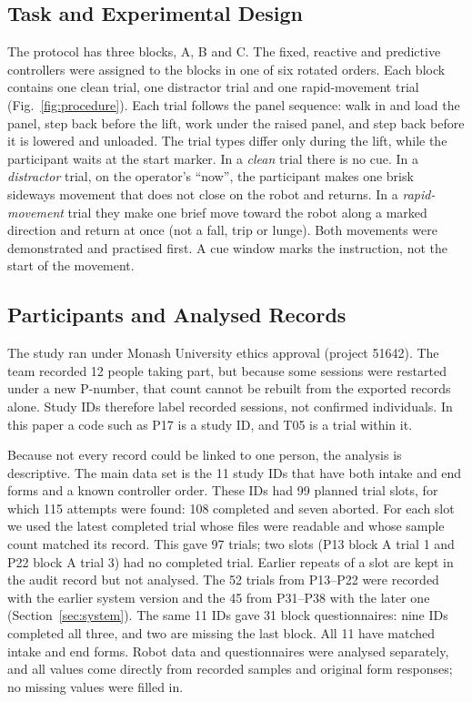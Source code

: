 \documentclass{IEEEtran}
\begin{document}
\subsection{Task and Experimental Design}
The protocol has three blocks, A, B and C. The fixed, reactive and predictive
controllers were assigned to the blocks in one of six rotated orders. Each
block contains one clean trial, one distractor trial and one rapid-movement
trial (Fig.~\ref{fig:procedure}). Each trial follows the panel sequence: walk
in and load the panel, step back before the lift, work under the raised panel,
and step back before it is lowered and unloaded. The trial types differ only
during the lift, while the participant waits at the start marker. In a
\emph{clean} trial there is no cue. In a \emph{distractor} trial, on the
operator's ``now'', the participant makes one brisk sideways movement that does
not close on the robot and returns. In a \emph{rapid-movement} trial they make
one brief move toward the robot along a marked direction and return at once
(not a fall, trip or lunge). Both movements were demonstrated and practised
first. A cue window marks the instruction, not the start of the movement.

\subsection{Participants and Analysed Records}
\label{sec:participants}
The study ran under Monash University ethics approval (project 51642). The team
recorded 12 people taking part, but because some sessions were restarted under
a new P-number, that count cannot be rebuilt from the exported records alone.
Study IDs therefore label recorded sessions, not confirmed individuals. In this
paper a code such as P17 is a study ID, and T05 is a trial within it.

Because not every record could be linked to one person, the analysis is
descriptive. The main data set is the 11 study IDs that have both intake and
end forms and a known controller order. These IDs had 99 planned trial slots,
for which 115 attempts were found: 108 completed and seven aborted. For each
slot we used the latest completed trial whose files were readable and whose
sample count matched its record. This gave 97 trials; two slots (P13 block A
trial 1 and P22 block A trial 3) had no completed trial. Earlier repeats of a
slot are kept in the audit record but not analysed. The 52 trials from P13--P22
were recorded with the earlier system version and the 45 from P31--P38 with
the later one (Section~\ref{sec:system}). The same 11 IDs gave 31
block questionnaires: nine IDs completed all three, and two are missing the
last block. All 11 have matched intake and end forms. Robot data and
questionnaires were analysed separately, and all values come directly from
recorded samples and original form responses; no missing values were filled in.
\end{document}
